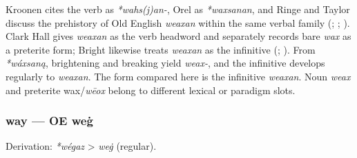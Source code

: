 \documentclass[
  british,
  a4paper,
]{article}
\begin{document}
Kroonen cites the verb as \emph{*wahs(j)an-}, Orel as \emph{*waxsanan},
and Ringe and Taylor discuss the prehistory of Old English \emph{weaxan}
within the same verbal family (; ;
). Clark Hall
gives \emph{weaxan} as the verb headword and separately records bare
\emph{wax} as a preterite form; Bright likewise treats \emph{weaxan} as
the infinitive (;
). From
\emph{*wáxsaną}, brightening and breaking yield \emph{weax-}, and the
infinitive develops regularly to \emph{weaxan}. The form compared here
is the infinitive \emph{weaxan}. Noun \emph{weax} and preterite
wax/\emph{wēox} belong to different lexical or paradigm slots.

\subsubsection{way --- OE weġ}\label{way-oe-weux121}

Derivation: \emph{*wégaz} \textgreater{} \emph{weġ} (regular).

\begingroup
\setlength{\fboxsep}{6pt}
\end{document}
